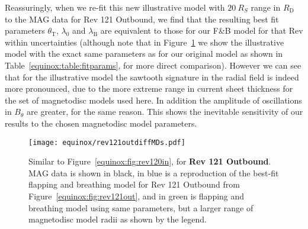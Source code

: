 Reassuringly, when we re-fit this new illustrative model with $\SI{20}{R_S}$ range in $R_\mathrm{D}$ to the MAG data for Rev 121 Outbound, we find that the resulting best fit parameters $\theta_\mathrm{T}$, $\lambda_0$ and $\lambda_\mathrm{B}$ are equivalent to those for our F{\&}B model for that Rev within uncertainties (although note that in Figure~\ref{equinox:fig:rev121outdiffMDs} we show the illustrative model with the exact same parameters as for our original model as shown in Table~\ref{equinox:table:fitparams}, for more direct comparison). However we can see that for the illustrative model the sawtooth signature in the radial field is indeed more pronounced, due to the more extreme range in current sheet thickness for the set of magnetodisc models used here. In addition the amplitude of oscillations in $B_{\theta}$ are greater, for the same reason. This shows the inevitable sensitivity of our results to the chosen magnetodisc model parameters.
\begin{figure}
\centering
\texttt{[image: equinox/rev121outdiffMDs.pdf]}
\caption[\textit{Cassini} MAG data, FO and F{\&}B model predictions for Rev 121 Outbound, with modified F{\&}B model parameters.]{Similar to Figure~\ref{equinox:fig:rev120in}, for \textbf{Rev 121 Outbound}. MAG data is shown in black, in blue is a reproduction of the best-fit flapping and breathing model for Rev 121 Outbound from Figure~\ref{equinox:fig:rev121out}, and in green is flapping and breathing model using same parameters, but a larger range of magnetodisc model radii as shown by the legend.}
\label{equinox:fig:rev121outdiffMDs}
\end{figure}

